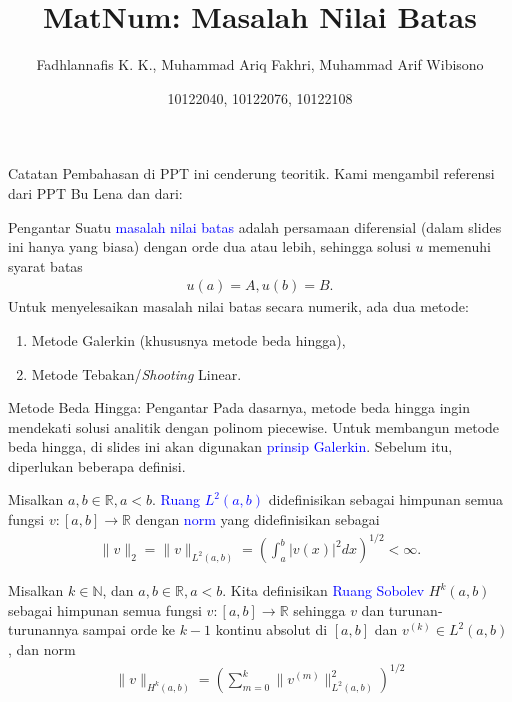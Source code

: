 \documentclass[xcolor={dvipsnames}, 9pt]{beamer}
\title{MatNum: Masalah Nilai Batas}
\author{Fadhlannafis K. K., Muhammad Ariq Fakhri, Muhammad Arif Wibisono}
\date{10122040, 10122076, 10122108}
\renewcommand{\emph}[1]{\textcolor{Blue}{#1}}
\begin{document}
	\begin{frame}[plain]
		\maketitle
	\end{frame}
	\begin{frame}{Catatan}
		Pembahasan di PPT ini cenderung teoritik. Kami mengambil referensi dari PPT Bu Lena dan dari:
		\nocite{*}
		\printbibliography
	\end{frame}
	\begin{frame}{Pengantar}
		Suatu \emph{masalah nilai batas} adalah persamaan diferensial (dalam slides ini hanya yang biasa) dengan orde dua atau lebih, sehingga solusi $u$ memenuhi syarat batas
		\begin{align*}
			u(a) = A, u(b) = B.
		\end{align*}
		Untuk menyelesaikan masalah nilai batas secara numerik, ada dua metode:
		\begin{enumerate}
			\item Metode Galerkin (khususnya metode beda hingga),
			\item Metode Tebakan/\textit{Shooting} Linear.
		\end{enumerate}
	\end{frame}
	\begin{frame}{Metode Beda Hingga: Pengantar}
		Pada dasarnya, metode beda hingga ingin mendekati solusi analitik dengan polinom piecewise. Untuk membangun metode beda hingga, di slides ini akan digunakan \emph{prinsip Galerkin}. Sebelum itu, diperlukan beberapa definisi. \\
		\begin{definition}[Ruang $L^2$]
			Misalkan $a,b\in\mathbb{R}, a<b$. \emph{Ruang $L^2(a,b)$} didefinisikan sebagai himpunan semua fungsi $v:[a,b]\to\mathbb{R}$ dengan \emph{norm} yang didefinisikan sebagai
			\begin{align*}
				\|v\|_2 = \|v\|_{L^2(a,b)} = \left(\int_{a}^{b} |v(x)|^2 dx\right)^{1/2} < \infty.
			\end{align*}
		\end{definition}
		\begin{definition}
			Misalkan $k\in\mathbb{N}$, dan $a,b\in\mathbb{R}, a<b$. Kita definisikan \emph{Ruang Sobolev} $H^k(a,b)$ sebagai himpunan semua fungsi $v:[a,b]\to\mathbb{R}$ sehingga $v$ dan turunan-turunannya sampai orde ke $k-1$ kontinu absolut di $[a,b]$ dan $v^{(k)}\in L^2(a,b)$, dan norm
			\begin{align*}
				\|v\|_{H^k(a,b)} = \left(\sum_{m=0}^{k}\|v^{(m)}\|^2_{L^2(a,b)}\right)^{1/2}
			\end{align*}
		\end{definition}
	\end{frame}
\end{document}
